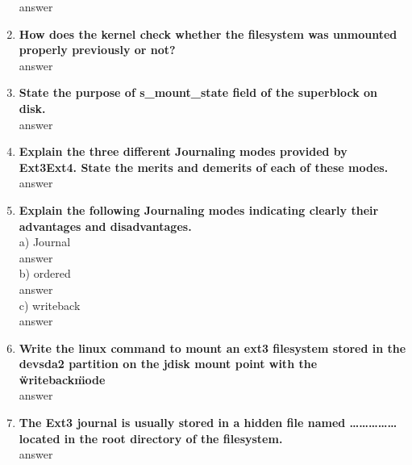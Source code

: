 \documentclass[a4paper,12pt]{article}
\begin{document}
\begin{flushleft}
\begin{enumerate}
{\color{red}answer}\\
\item \textbf{ How does the kernel check whether the filesystem was unmounted properly previously or not?}\\
{\color{red}answer}\\
\item \textbf{ State the purpose of s\_mount\_state field of the superblock on disk.}\\
{\color{red}answer}\\
\item \textbf{ Explain the three different Journaling modes provided by Ext3\/Ext4. State the merits and demerits of each of these modes.}\\
{\color{red}answer}\\
\item \textbf{ Explain the following Journaling modes indicating clearly their advantages and disadvantages.}\\
a) Journal\\
{\color{red}answer}\\
 b) ordered\\
 {\color{red}answer}\\
 c) writeback\\
{\color{red}answer}\\
\item \textbf{ Write the linux command to mount an ext3 filesystem stored in the \/dev\/sda2 partition on the \/jdisk mount point with the \"writeback\" mode}\\
{\color{red}answer}\\
\item \textbf{ The Ext3 journal is usually stored in a hidden file named ……………located in the root directory of the filesystem.}\\
{\color{red}answer}\\
\end{enumerate}



\end{flushleft}
\end{document}
